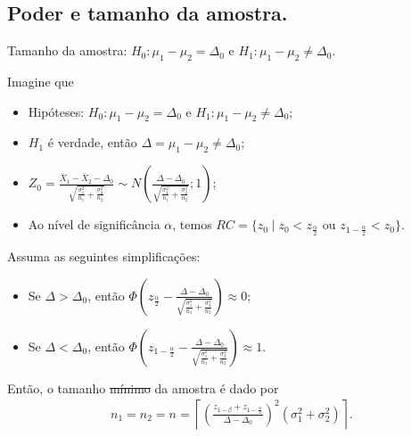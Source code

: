 \documentclass[9pt]{beamer}
\begin{document}
\subsection{Poder e tamanho da amostra.}

\begin{frame}{Tamanho da amostra: $H_0:\mu_1 - \mu_2 = \Delta_0$ e $H_1: \mu_1 - \mu_2 \neq \Delta_0$.}

\footnotesize

Imagine que
\begin{itemize}
	\item Hipóteses: $H_0: \mu_1 - \mu_2 = \Delta_0$ e $H_1: \mu_1 -  \mu_2 \neq \Delta_0$;
	\item $H_1$ é verdade, então $\Delta = \mu_1-\mu_2 \neq \Delta_0$;
	\item $Z_0 = \frac{\bar{X}_1 - \bar{X}_2 - \Delta_0}{ \sqrt{ \frac{\sigma_1^2}{n_1} + \frac{\sigma_2^2}{n_2} } } \sim N\left( \frac{\Delta - \Delta_0}{ \sqrt{ \frac{\sigma_1^2}{n_1} + \frac{\sigma_2^2}{n_2} } } ; 1\right)$;
	\item Ao nível de significância $\alpha$, temos $RC = \{ z_0 \mid z_0 < z_{\frac{\alpha}{2}} \mbox{ ou } z_{1-\frac{\alpha}{2}} < z_0  \}$.
\end{itemize}
\vfill

Assuma as seguintes simplificações:
\begin{itemize}
	\item Se $\Delta > \Delta_0$, então $\Phi\left( z_\frac{\alpha}{2} - \frac{\Delta - \Delta_0}{ \sqrt{ \frac{\sigma_1^2}{n_1} + \frac{\sigma_2^2}{n_2} } } \right) \approx 0$;
	\item Se $\Delta < \Delta_0$, então $\Phi\left( z_{1-\frac{\alpha}{2}} - \frac{\Delta - \Delta_0}{ \sqrt{ \frac{\sigma_1^2}{n_1} + \frac{\sigma_2^2}{n_2} } } \right) \approx 1$.
\end{itemize}

Então, o tamanho \sout{mínimo} da amostra é dado por
\begin{align*}
	n_1 = n_2 = n = \left\lceil \left( \frac{z_{1-\beta} + z_{1-\frac{\alpha}{2}}}{\Delta - \Delta_0} \right)^2 (\sigma_1^2 + \sigma_2^2) \right\rceil.
\end{align*}

\normalsize
\end{frame}
\end{document}
